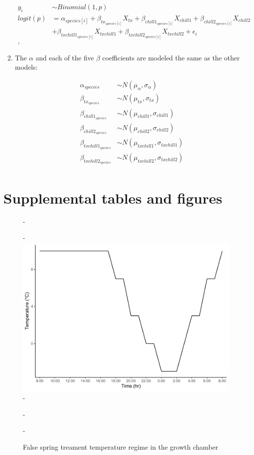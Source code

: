 \documentclass{article}\usepackage[]{graphicx}\usepackage[]{color}
\begin{document}
\begin{enumerate}
\begin{align*}
 y_i & \sim Binomial(1,p) \tag{2} \\
logit(p) &= \alpha_{species[i]} + \beta_{tx_{species[i]}}X_{tx} + \beta_{chill1_{species[i]}}X_{chill1} + \beta_{chill2_{species[i]}}X_{chill2}\\
&+ \beta_{txchill1_{species[i]}}X_{txchill1} + \beta_{txchill2_{species[i]}}X_{txchill2} + \epsilon_i \nonumber\\,
\end{align*}

\item The $\alpha$ and each of the five $\beta$ coefficients are modeled the same as the other models:

\begin{align*}
\alpha_{species} & \sim N(\mu_{\alpha}, \sigma_{\alpha}) \\
\beta_{tx_{species}} & \sim N(\mu_{tx}, \sigma_{tx}) \\
\beta_{chill1_{species}} & \sim N(\mu_{chill1}, \sigma_{chill1}) \\
\beta_{chill2_{species}} & \sim N(\mu_{chill2}, \sigma_{chill2}) \\
\beta_{txchill1_{species}} & \sim N(\mu_{txchill1}, \sigma_{txchill1}) \\
\beta_{txchill2_{species}} & \sim N(\mu_{txchill2}, \sigma_{txchill2}) \\
\end{align*}

\end{enumerate}

\section*{Supplemental tables and figures}

{\begin{figure} [H]
  -\begin{center}
  -\includegraphics[width=12cm]{..//analyses/figures/growthchamber.pdf}
  -\caption{False spring treament temperature regime in the growth chamber}\label{fig:gccond}
  -\end{center}
  -\end{figure}}
  
\end{document}
